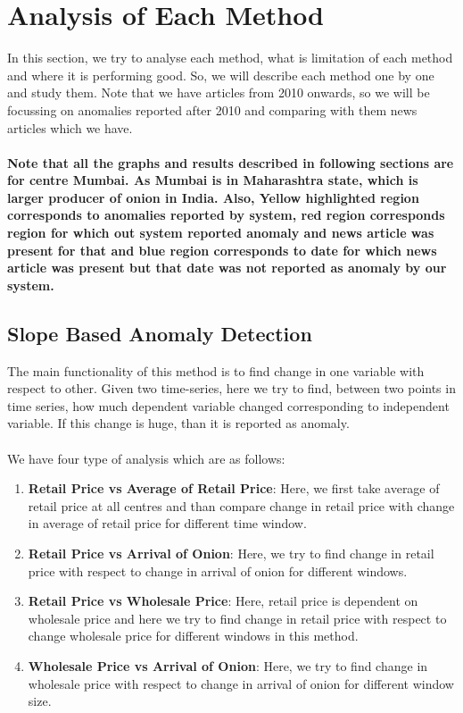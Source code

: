 \documentclass[a4paper,10pt]{report}
\begin{document}
	
\section{Analysis of Each Method}

In this section, we try to analyse each method, what is limitation of each method and where it is performing good. So, we will describe each method one by one and study them. Note that we have articles from 2010 onwards, so we will be focussing on anomalies reported after 2010 and comparing with them news articles which we have. \\
\\
\textbf{Note that all the graphs and results described in following sections are for centre Mumbai. As Mumbai is in Maharashtra state, which is larger producer of onion in India. Also, Yellow highlighted region corresponds to anomalies reported by system, red region corresponds region for which out system reported anomaly and news article was present for that and blue region corresponds to date for which news article was present but that date was not reported as anomaly by our system.}

\subsection{Slope Based Anomaly Detection}
	
		The main functionality of this method is to find change in one variable with respect to other. Given two time-series, here we try to find, between two points in time series, how much dependent variable changed corresponding to independent variable. If this change is huge, than it is reported as anomaly.\\
		\\
		We have four type of analysis which are as follows:
		\begin{enumerate}
			\item \textbf{Retail Price vs Average of Retail Price}: Here, we first take average of retail price at all centres and than compare change in retail price with change in average of retail price for different time window.			
			\item \textbf{Retail Price vs Arrival of Onion}: Here, we try to find change in retail price with respect to change in arrival of onion for different windows. 
			\item \textbf{Retail Price vs Wholesale Price}: Here, retail price is dependent on wholesale price and here we try to find change in retail price with respect to change wholesale price for different windows in this method.
			\item \textbf{Wholesale Price vs Arrival of Onion}: Here, we try to find change in wholesale price with respect to change in arrival of onion for different window size.
		\end{enumerate}
		
\end{document}
